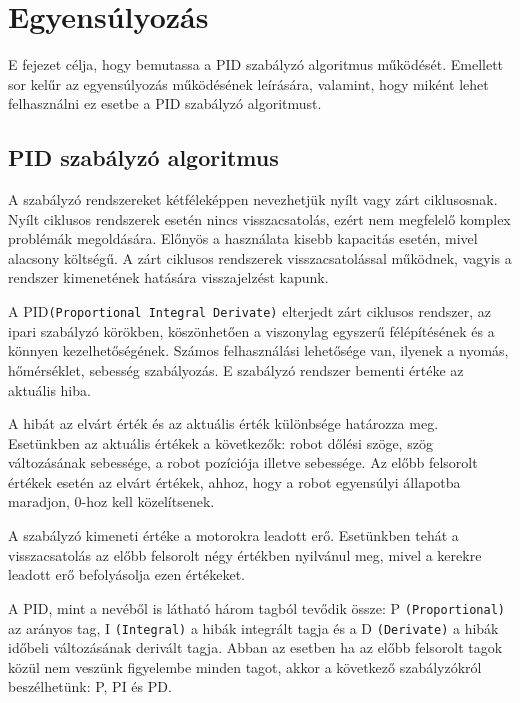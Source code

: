 \chapter{Egyensúlyozás}\label{ch:EGYENSULY}
\begin{osszefoglal}
E fejezet célja, hogy bemutassa a PID szabályzó algoritmus működését. Emellett sor kelűr az egyensúlyozás működésének leírására, valamint, hogy miként lehet felhasználni ez esetbe a PID szabályzó algoritmust.
\end{osszefoglal}

\section{PID szabályzó algoritmus}\label{sec:EGYENSULY:pid}

A szabályzó rendszereket kétféleképpen nevezhetjük nyílt vagy zárt ciklusosnak.  Nyílt ciklusos rendszerek esetén nincs visszacsatolás, ezért nem megfelelő komplex problémák megoldására. Előnyös a használata kisebb kapacitás esetén, mivel alacsony költségű. A zárt ciklusos rendszerek visszacsatolással működnek, vagyis a rendszer kimenetének hatására visszajelzést kapunk.

A PID\texttt{(Proportional Integral Derivate)} elterjedt zárt ciklusos rendszer, az ipari szabályzó körökben, köszönhetően a viszonylag egyszerű félépítésének és a könnyen kezelhetőségének. Számos felhasználási lehetősége van, ilyenek a nyomás, hőmérséklet, sebesség szabályozás. E szabályzó rendszer bementi értéke az aktuális hiba.

A hibát az elvárt érték és az aktuális érték különbsége határozza meg. Esetünkben az aktuális értékek a következők: robot dőlési szöge, szög változásának sebessége, a robot pozíciója illetve sebessége. Az előbb felsorolt értékek esetén az elvárt értékek, ahhoz, hogy a robot egyensúlyi állapotba maradjon, 0-hoz kell közelítsenek.

A szabályzó kimeneti értéke a motorokra leadott erő. Esetünkben tehát a visszacsatolás az előbb felsorolt négy értékben nyilvánul meg, mivel a kerekre leadott erő befolyásolja ezen értékeket.

A PID, mint a nevéből is látható három tagból tevődik össze: P \texttt{(Proportional)} az arányos tag, I \texttt{(Integral)} a hibák integrált tagja és a D \texttt{(Derivate)} a hibák időbeli változásának derivált tagja. Abban az esetben ha az előbb felsorolt tagok közül nem veszünk figyelembe minden tagot, akkor a következő szabályzókról beszélhetünk: P, PI és PD.

